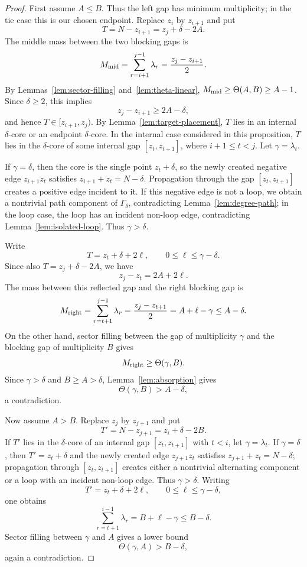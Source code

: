 \documentclass[11pt]{article}
\begin{document}
\begin{proof}
First assume $A\le B$.  Thus the left gap has minimum multiplicity; in the tie case this is our chosen endpoint.  Replace $z_i$ by $z_{i+1}$ and put
\[
        T=N-z_{i+1}=z_j+\delta-2A.
\]
The middle mass between the two blocking gaps is
\[
        M_{\rm mid}=\sum_{r=i+1}^{j-1}\lambda_r=\frac{z_j-z_{i+1}}2.
\]
By Lemmas~\ref{lem:sector-filling} and~\ref{lem:theta-linear}, $M_{\rm mid}\ge\Theta(A,B)\ge A-1$.  Since $\delta\ge2$, this implies
\[
        z_j-z_{i+1}\ge 2A-\delta,
\]
and hence $T\in[z_{i+1},z_j)$.  By Lemma~\ref{lem:target-placement}, $T$ lies in an internal $\delta$-core or an endpoint $\delta$-core.  In the internal case considered in this proposition, $T$ lies in the $\delta$-core of some internal gap $[z_t,z_{t+1}]$, where $i+1\le t<j$.  Let $\gamma=\lambda_t$.

If $\gamma=\delta$, then the core is the single point $z_t+\delta$, so the newly created negative edge $z_{i+1}z_t$ satisfies $z_{i+1}+z_t=N-\delta$.  Propagation through the gap $[z_t,z_{t+1}]$ creates a positive edge incident to it.  If this negative edge is not a loop, we obtain a nontrivial path component of $\Gamma_\delta$, contradicting Lemma~\ref{lem:degree-path}; in the loop case, the loop has an incident non-loop edge, contradicting Lemma~\ref{lem:isolated-loop}.  Thus $\gamma>\delta$.

Write
\[
        T=z_t+\delta+2\ell,
        \qquad
        0\le \ell\le \gamma-\delta.
\]
Since also $T=z_j+\delta-2A$, we have
\[
        z_j-z_t=2A+2\ell.
\]
The mass between this reflected gap and the right blocking gap is
\[
        M_{\rm right}=\sum_{r=t+1}^{j-1}\lambda_r
        =\frac{z_j-z_{t+1}}2
        =A+\ell-\gamma
        \le A-\delta.
\]
On the other hand, sector filling between the gap of multiplicity $\gamma$ and the blocking gap of multiplicity $B$ gives
\[
        M_{\rm right}\ge\Theta(\gamma,B).
\]
Since $\gamma>\delta$ and $B\ge A>\delta$, Lemma~\ref{lem:absorption} gives
\[
        \Theta(\gamma,B)>A-\delta,
\]
a contradiction.

Now assume $A>B$.  Replace $z_j$ by $z_{j+1}$ and put
\[
        T'=N-z_{j+1}=z_i+\delta-2B.
\]
If $T'$ lies in the $\delta$-core of an internal gap $[z_t,z_{t+1}]$ with $t<i$, let $\gamma=\lambda_t$.  If $\gamma=\delta$, then $T'=z_t+\delta$ and the newly created edge $z_{j+1}z_t$ satisfies $z_{j+1}+z_t=N-\delta$; propagation through $[z_t,z_{t+1}]$ creates either a nontrivial alternating component or a loop with an incident non-loop edge.  Thus $\gamma>\delta$.  Writing
\[
        T'=z_t+\delta+2\ell,
        \qquad 0\le\ell\le\gamma-\delta,
\]
one obtains
\[
        \sum_{r=t+1}^{i-1}\lambda_r
        =B+\ell-\gamma
        \le B-\delta.
\]
Sector filling between $\gamma$ and $A$ gives a lower bound
\[
        \Theta(\gamma,A)>B-\delta,
\]
again a contradiction.
\end{proof}
\end{document}
